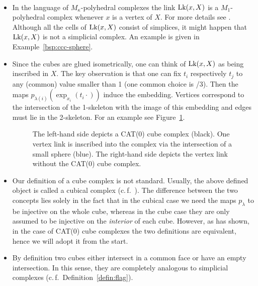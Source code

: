 \begin{rem}
  \label{rem:complex}~
  \vspace{-6pt}
  \begin{itemize}
  \item In the language of \(M_\kappa\)-polyhedral complexes the link \(\operatorname{Lk}(x, X)\) is a \(M_1\)-polyhedral complex whenever \(x\) is a vertex of \(X\). For more details see \textcite[Section~I.7]{MR1744486}. Although all the cells of \(\operatorname{Lk}(x,X)\) consist of simplices, it might happen that \(\operatorname{Lk}(x,X)\) is not a simplicial complex. An example is given in Example~\ref{bsp:ccc-sphere}. 
  \item Since the cubes are glued isometrically, one can think of \(\operatorname{Lk}(x,X)\) as being inscribed in \(X\). The key observation is that one can fix \(t_i\) respectively \(t_j\) to any (common) value smaller than 1 (one common choice is {/3}). Then the maps \(p_{\lambda(i)}(\exp_{x_i}(t_i \cdot))\) induce the embedding. Vertices correspond to the intersection of the 1-skeleton with the image of this embedding and edges must lie in the 2-skeleton. For an example see Figure~\ref{fig:link}.
    \begin{figure}[htbp]
      \centering
      
      \caption{The left-hand side depicts a CAT(0) cube complex (black). One vertex link is inscribed into the complex via the intersection of a small sphere (blue). The right-hand side depicts the vertex link without the CAT(0) cube complex.}
      \label{fig:link}
    \end{figure}
  \item Our definition of a cube complex is not standard. Usually, the above defined object is called a cubical complex (c.\,f.~\cite[Def.~I.7.37]{MR1744486}). The difference between the two concepts lies solely in the fact that in the cubical case we need the maps \(p_\lambda\) to be injective on the whole cube, whereas in the cube case they are only assumed to be injective on the \emph{interior} of each cube. However, as \textcite[Thm.~C.4]{MR3029427} has shown, in the case of CAT(0) cube complexes the two definitions are equivalent, hence we will adopt it from the start.
  \item By definition two cubes either intersect in a common face or have an empty intersection. In this sense, they are completely analogous to simplicial complexes (c.\,f.\ Definition~\ref{defin:flag}). 
  \end{itemize}
\end{rem}

